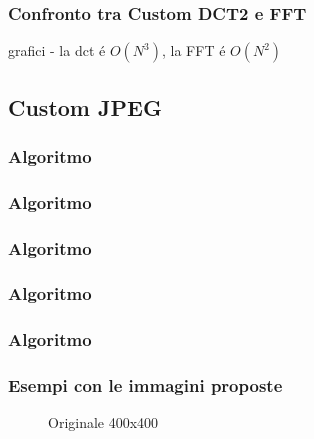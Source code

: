 \documentclass{beamer}
\begin{document}
\begin{frame}
\frametitle{Confronto tra Custom DCT2 e FFT}
grafici - la dct \'e $O(N^3)$, la FFT \'e $O(N^2)$
\end{frame}

\subsection{Custom JPEG}

\begin{frame}
\frametitle{Algoritmo}



\end{frame}

\begin{frame}
	\frametitle{Algoritmo}

\end{frame}

\begin{frame}
	\frametitle{Algoritmo}
	
\end{frame}

\begin{frame}
	\frametitle{Algoritmo}
	
\end{frame}

\begin{frame}
	\frametitle{Algoritmo}
	
\end{frame}

\begin{frame}
\frametitle{Esempi con le immagini proposte}
\begin{figure}
		\caption{Originale 400x400}
\end{figure}

\end{frame}
\end{document}
